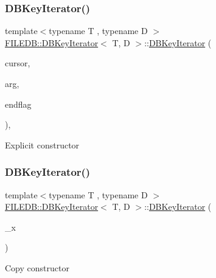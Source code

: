 \subsubsection{\texorpdfstring{DBKeyIterator()}{DBKeyIterator()}\hspace{0.1cm}{\footnotesize\ttfamily [5/6]}}
{\footnotesize\ttfamily template$<$typename T , typename D $>$ \\
\mbox{\hyperlink{classFILEDB_1_1DBKeyIterator}{F\+I\+L\+E\+D\+B\+::\+D\+B\+Key\+Iterator}}$<$ T, D $>$\+::\mbox{\hyperlink{classFILEDB_1_1DBKeyIterator}{D\+B\+Key\+Iterator}} (\begin{DoxyParamCaption}\item[{const \mbox{\hyperlink{classFILEDB_1_1DBCursor}{D\+B\+Cursor}} \&}]{cursor,  }\item[{const T \&}]{arg,  }\item[{int}]{endflag }\end{DoxyParamCaption})\hspace{0.3cm}{\ttfamily [inline]}, {\ttfamily [explicit]}}

Explicit constructor \mbox{\label{classFILEDB_1_1DBKeyIterator_ac1fa531110379c3deb566758095e8a0e}} 
\subsubsection{\texorpdfstring{DBKeyIterator()}{DBKeyIterator()}\hspace{0.1cm}{\footnotesize\ttfamily [6/6]}}
{\footnotesize\ttfamily template$<$typename T , typename D $>$ \\
\mbox{\hyperlink{classFILEDB_1_1DBKeyIterator}{F\+I\+L\+E\+D\+B\+::\+D\+B\+Key\+Iterator}}$<$ T, D $>$\+::\mbox{\hyperlink{classFILEDB_1_1DBKeyIterator}{D\+B\+Key\+Iterator}} (\begin{DoxyParamCaption}\item[{const \mbox{\hyperlink{classFILEDB_1_1DBKeyIterator}{D\+B\+Key\+Iterator}}$<$ T, D $>$ \&}]{\+\_\+x }\end{DoxyParamCaption})\hspace{0.3cm}{\ttfamily [inline]}}

Copy constructor \mbox{\label{classFILEDB_1_1DBKeyIterator_a54300ef8000ed2910c47d931ee091113}} 
